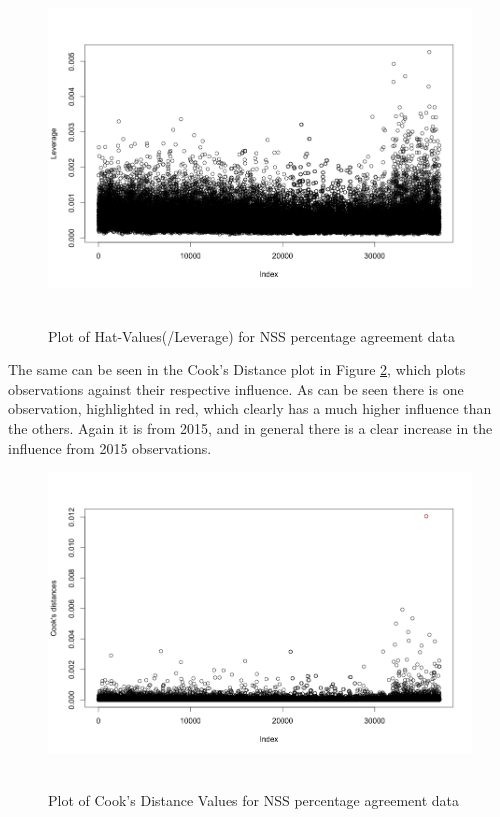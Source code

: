 \documentclass[11pt,a4paper]{report}
\begin{document}
\begin{figure}[H]
	\begin{center}
		\includegraphics[scale=0.4]{images/LeveragePlot}~\\		
		\caption{Plot of Hat-Values(/Leverage) for NSS percentage agreement data}
		\label{fig:LeveragePlot}
	\end{center}
\end{figure}


The same can be seen in the Cook's Distance plot in Figure \ref{fig:CooksPlot}, which plots observations against their respective influence. As can be seen there is one observation, highlighted in red, which clearly has a much higher influence than the others. Again it is from 2015, and in general there is a clear increase in the influence from 2015 observations.

\begin{figure}[H]
	\begin{center}
		\includegraphics[scale=0.4]{images/CooksDPlot}~\\		
		\caption{Plot of Cook's Distance Values for NSS percentage agreement data}
		\label{fig:CooksPlot}
	\end{center}
\end{figure}
\end{document}
